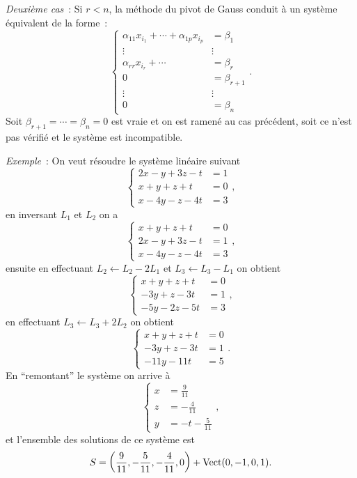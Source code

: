 \emph{Deuxième cas}~: Si \(r<n\), la méthode du pivot de Gauss conduit à un
système équivalent de la forme~:
\begin{equation}
  \begin{cases}
    \alpha_{11}x_{i_1} + \dotsb + \alpha_{1p}x_{i_p} & = \beta_1 \\
    \vdots & \vdots \\    \alpha_{rr}x_{i_r} + \dotsb  & = \beta_r\\
    0 & = \beta_{r+1} \\
    \vdots & \vdots \\
    0 & = \beta_{n}
  \end{cases}.
\end{equation}
Soit \(\beta_{r+1}=\cdots=\beta_{n} = 0\) est vraie et on est ramené au cas
précédent, soit ce n'est pas vérifié et le système est incompatible.

\emph{Exemple}~: On veut résoudre le système linéaire suivant
\begin{equation}
  \begin{cases}
    2x-y+3z-t& = 1\\
    x+y+z+t& = 0\\
    x-4y-z-4t& = 3
  \end{cases},
\end{equation}
en inversant \(L_1\) et \(L_2\) on a
\begin{equation}
  \begin{cases} x+y+z+t& = 0\\
    2x-y+3z-t& = 1\\
    x-4y-z-4t& = 3
  \end{cases},
\end{equation}
ensuite en effectuant \(L_2 \leftarrow L_2-2L_1\) et \(L_3 \leftarrow
L_3-L_1\) on obtient
\begin{equation}
  \begin{cases} x+y+z+t& = 0\\
    -3y+z-3t& = 1\\
    -5y-2z-5t& = 3
  \end{cases},
\end{equation}
en effectuant \(L_3 \leftarrow L_3+2L_2\) on obtient
\begin{equation}
  \begin{cases} x+y+z+t& = 0\\
    -3y+z-3t& = 1\\
    -11y-11t& = 5
  \end{cases}.
\end{equation}
En ``remontant'' le système on arrive à
\begin{equation}
  \begin{cases}
    x &= \frac{9}{11} \\
    z &= -\frac{4}{11}\\
    y &= -t -\frac{5}{11}
  \end{cases},
\end{equation}
et l'ensemble des solutions de ce système est
\begin{equation}
  S = \left(\frac{9}{11}, -\frac{5}{11}, -\frac{4}{11}, 0\right) +
  \operatorname{Vect}(0,-1,0,1).
\end{equation}

